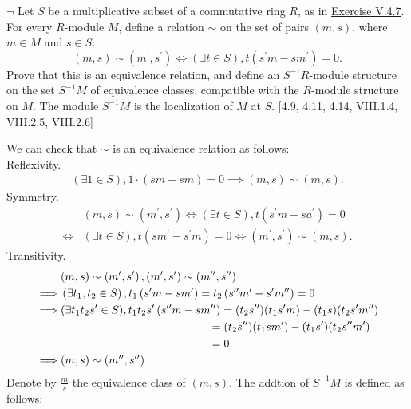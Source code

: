\hypertarget{Exercise V.4.8}{}
\begin{problem}[4.8]
$\neg$ Let $S$ be a multiplicative subset of a commutative ring $R$, as in \hyperlink{Exercise V.4.7}{Exercise V.4.7}. For every $R$-module $M$, define a relation $\sim$ on the set of pairs $(m, s)$, where $m \in M$ and $s \in S$:
$$
(m, s) \sim\left(m^{\prime}, s^{\prime}\right) \Longleftrightarrow(\exists t \in S), t\left(s^{\prime} m-s m^{\prime}\right)=0 .
$$
Prove that this is an equivalence relation, and define an $S^{-1} R$-module structure on the set $S^{-1} M$ of equivalence classes, compatible with the $R$-module structure on $M$. The module $S^{-1} M$ is the localization of $M$ at $S$. [4.9, 4.11, 4.14, VIII.1.4, VIII.2.5, VIII.2.6]
\end{problem}
\begin{solution}
    We can check that $\sim$ is an equivalence relation as follows:\\
Reflexivity.
    \begin{align*}
         (\exists 1 \in S), 1\cdot\left(s m-s m\right)=0\implies (m, s) \sim\left(m, s\right).
    \end{align*}
    Symmetry.
    \begin{align*}
        &(m, s) \sim\left(m^{\prime}, s^{\prime}\right) \Longleftrightarrow\left(\exists t \in S\right), t\left(s^{\prime} m-s a^{\prime}\right)=0 \\
        \iff&  (\exists t \in S), t\left(sm^{\prime}-s^{\prime} m\right)=0\iff \left(m^{\prime}, s^{\prime}\right)  \sim (m, s).
    \end{align*}
    Transitivity.
    \begin{align*}
        &(m, s) \sim\left(m^{\prime}, s^{\prime}\right) ,\left(m^{\prime}, s^{\prime}\right) \sim \left(m'', s''\right)\\
        \implies &\left(\exists t_1,t_2 \in S\right), t_1\left(s^{\prime} m-s m^{\prime}\right)=t_2\left(s'' m'-s' m''\right)=0  \\
        \implies & (\exists t_1t_2s' \in S), t_1t_2s'\left(s'' m-s m''\right)=(t_2s'')(t_1s'm)-(t_1s)(t_2s'm'')\\
        &\hspace{13.25em}=(t_2s'')(t_1sm')-(t_1s')(t_2s'' m')\\
        &\hspace{13.25em}=0\\
        \implies & (m, s)\sim \left(m'', s''\right) .
    \end{align*}
    Denote by $\frac{m}{s}$ the equivalence class of $(m, s)$. The addtion of $S^{-1} M$ is defined as follows:

\end{solution}

